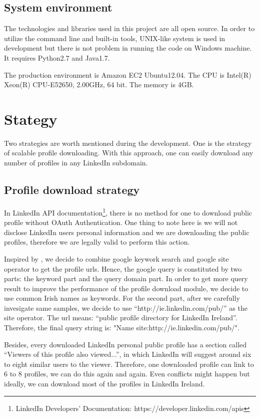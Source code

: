 \subsection{System environment}\label{subsec:env}

The technologies and libraries used in this project are all open source. In order to utilize the command line and built-in tools, UNIX-like system is used in development but there is not problem in running the code on Windows machine. It requires Python2.7 and Java1.7.

The production environment is Amazon EC2 Ubuntu12.04. The CPU is Intel(R) Xeon(R) CPU-E52650, 2.00GHz, 64 bit. The memory is 4GB.

\section{Stategy}

Two strategies are worth mentioned during the development. One is the strategy of scalable profile downloading. With this approach, one can easily download any number of profiles in any LinkedIn subdomain.

\subsection{Profile download strategy}
In LinkedIn API documentation\footnote{LinkedIn Developers' Documentation: https://developer.linkedin.com/apis}, there is no method for one to download public profile without OAuth Authentication. One thing to note here is we will not disclose LinkedIn users personal information and we are downloading the public profiles, therefore we are legally valid to perform this action.

Inspired by \cite{li2012}, we decide to combine google keywork search and google site operator to get the profile urls. Hence, the google query is constituted by two parts: the keyword part and the query domain part. In order to get more query result to improve the performance of the profile download module, we decide to use common Irish names as keywords. For the second part, after we carefully invesigate same samples, we decide to use ``http://ie.linkedin.com/pub/'' as the site operator. The url means: ``public profile directory for LinkedIn Ireland''. Therefore, the final query string is: "{Name} site:http://ie.linkedin.com/pub/".

Besides, every downloaded LinkedIn personal public profile has a section called ``Viewers of this profile also viewed...'', in which LinkedIn will suggest around six to eight similar users to the viewer. Therefore, one downloaded profile can link to 6 to 8 profiles, we can do this again and again. Even conflicts might happen but ideally, we can download most of the profiles in LinkedIn Ireland.

